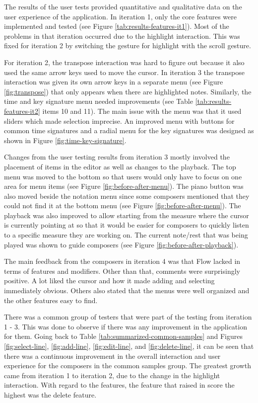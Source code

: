 		The results of the user tests provided quantitative and qualitative data on the user experience of the application. In iteration 1, only the core features were implemented and tested (see Figure \ref{tab:results-features-it1}). Most of the problems in that iteration occurred due to the highlight interaction. This was fixed for iteration 2 by switching the gesture for highlight with the scroll gesture. 

		For iteration 2, the transpose interaction was hard to figure out because it also used the same arrow keys used to move the cursor. In iteration 3 the transpose interaction was given its own arrow keys in a separate menu (see Figure \ref{fig:transpose}) that only appears when there are highlighted notes. Similarly, the time and key signature menu needed improvements (see Table \ref{tab:results-features-it2} items 10 and 11). The main issue with the menu was that it used sliders which made selection imprecise. An improved menu with buttons for common time signatures and a radial menu for the key signatures was designed as shown in Figure \ref{fig:time-key-signature}.

		Changes from the user testing results from iteration 3 mostly involved the placement of items in the editor as well as changes to the playback. The top menu was moved to the bottom so that users would only have to focus on one area for menu items (see Figure \ref{fig:before-after-menu}). The piano button was also moved beside the notation menu since some composers mentioned that they could not find it at the bottom menu (see Figure \ref{fig:before-after-menu}). The playback was also improved to allow starting from the measure where the cursor is currently pointing at so that it would be easier for composers to quickly listen to a specific measure they are working on. The current note/rest that was being played was shown to guide composers (see Figure \ref{fig:before-after-playback}).

		The main feedback from the composers in iteration 4 was that Flow lacked in terms of features and modifiers. Other than that, comments were surprisingly positive. A lot liked the cursor and how it made adding and selecting immediately obvious. Others also stated that the menus were well organized and the other features easy to find. 

		There was a common group of testers that were part of the testing from iteration 1 - 3. This was done to observe if there was any improvement in the application for them. Going back to Table \ref{tab:summarized-common-samples} and Figures \ref{fig:select-line}, \ref{fig:add-line}, \ref{fig:edit-line}, and \ref{fig:delete-line}, it can be seen that there was a continuous improvement in the overall interaction and user experience for the composers in the common samples group. The greatest growth came from iteration 1 to iteration 2, due to the change in the highlight interaction. With regard to the features, the feature that raised in score the highest was the delete feature. 

